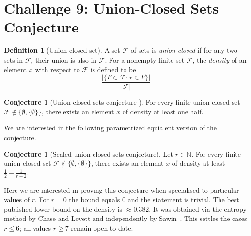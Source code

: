 \documentclass[12pt]{article}
\numberwithin{equation}{section}
\theoremstyle{definition}
\newtheorem{definition}{Definition}
\newtheorem{conjecture}[theorem]{Conjecture}
\begin{document}
\section*{Challenge 9: Union-Closed Sets Conjecture}

\begin{definition}[Union-closed set]
A set $\mathcal{F}$ of sets is \textit{union-closed} if for any two sets in $\mathcal{F}$, their union is also in $\mathcal{F}$. 
For a nonempty finite set $\mathcal{F}$, the \emph{density} of an element $x$ with respect to $\mathcal{F}$ is defined
to be 
\[
\frac{|\{ F \in \mathcal{F} : x \in F \}|}{|\mathcal{F}|}
\]
\end{definition}

\begin{conjecture}[Union-closed sets conjecture \mbox{\cite{nagel2023}}]
For every finite union-closed set $\mathcal{F}\notin\{\emptyset, \{\emptyset\}\}$, there exists an element $x$ of density at least one half.
\end{conjecture}

We are interested in the following parametrized equialent version of the conjecture.
\begin{conjecture}[Scaled union-closed sets conjecture]
Let $r\in \mathbb{N}$.
For every finite union-closed set $\mathcal{F}\notin\{\emptyset, \{\emptyset\}\}$, there exists an element $x$ of density at least $\frac{1}{2}-\frac{1}{r+2}$.
\end{conjecture}

Here we are interested in proving this conjecture when specialised to particular values of $r$. 
For $r=0$ the bound equals $0$ and the statement is trivial.
The best published lower bound on the density is $\approx 0.382$. It was obtained via the entropy method by Chase and Lovett \cite{chase2022approximate} and independently by Sawin~\cite{sawin2022unionclosed}. This settles the cases $r\leq 6$; all values $r\geq 7$ remain open to date.

\printbibliography
\end{document}
